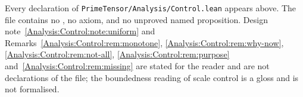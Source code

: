 \noindent
Every declaration of \texttt{PrimeTensor/Analysis/Control.lean} appears above.
The file contains no , no axiom, and no unproved named proposition.
Design note~\ref{Analysis:Control:note:uniform} and
Remarks~\ref{Analysis:Control:rem:monotone},
\ref{Analysis:Control:rem:why-now}, \ref{Analysis:Control:rem:not-all},
\ref{Analysis:Control:rem:purpose} and~\ref{Analysis:Control:rem:missing} are
stated for the reader and are not declarations of the file; the boundedness
reading of scale control is a gloss and is not formalised.
